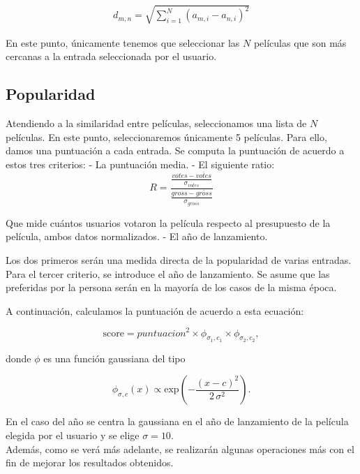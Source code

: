 \begin{eqnarray}
d_{m, n} = \sqrt{  \sum_{i = 1}^{N} \left( a_{m,i}  - a_{n,i} \right)^2  } 
\end{eqnarray}

En este punto, únicamente tenemos que seleccionar las $N$ películas que son más cercanas a la entrada seleccionada por el usuario.

\subsection{Popularidad}

Atendiendo a la similaridad entre películas, seleccionamos una lista de $N$ películas. En este punto, seleccionaremos únicamente 5 películas. Para ello, damos una puntuación a cada entrada. Se computa la puntuación de acuerdo a estos tres criterios:
- La puntuación media.
- El siguiente ratio:
\begin{equation}
    R = \frac{\frac{votes - \bar{votes}}{\sigma_{votes}}}{\frac{gross - \bar{gross}}{\sigma_{gross}}}
\end{equation}

Que mide cuántos usuarios votaron la película respecto al presupuesto de la película, ambos datos normalizados.
- El año de lanzamiento.

Los dos primeros serán una medida directa de la popularidad de varias entradas. Para el tercer criterio, se introduce el año de lanzamiento. Se asume que las preferidas por la persona serán en la mayoría de los casos de la misma época.

A continuación, calculamos la puntuación de acuerdo a esta ecuación:

\begin{equation}
\mathrm{score} = puntuacion^2 \times \phi_{\sigma_1, c_1} \times  \phi_{\sigma_2, c_2},
\label{eq:criteria}
\end{equation}

donde $\phi$ es una función gaussiana del tipo

\begin{equation}
\phi_{\sigma, c}(x) \propto \mathrm{exp}\left(-\frac{(x-c)^2}{2 \, \sigma^2}\right).
\end{equation}

En el caso del año se centra la gaussiana en el año de lanzamiento de la película elegida por el usuario y se elige $\sigma = 10$.\\

Además, como se verá más adelante, se realizarán algunas operaciones más con el fin de mejorar los resultados obtenidos.


